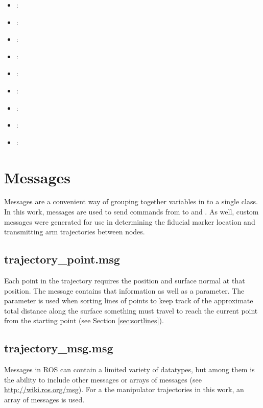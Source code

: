 \begin{itemize}

\item {} : 
\item {} : 
\item {} : 
\item {} : 
\item {} : 
\item {} : 
\item {} : 
\item {} : 
\item {} : 
\end{itemize}

\section{Messages}

Messages are a convenient way of grouping together variables in to a single class. In this work, messages are used to send commands from  to  and . As well, custom messages were generated for use in determining the fiducial marker location and transmitting arm trajectories between nodes.\\

\subsection{trajectory\_point.msg}
Each point in the trajectory requires the position and surface normal at that position. The  message contains that information as well as a  parameter. The  parameter is used when sorting lines of points to keep track of the approximate total distance along the surface something must travel to reach the current point from the starting point (see Section \ref{sec:sortlines}).\\
\subsection{trajectory\_msg.msg}
\label{sec:trajmsg}
Messages in ROS can contain a limited variety of datatypes, but among them is the ability to include other messages or arrays of messages (see \url{http://wiki.ros.org/msg}). For a the manipulator trajectories in this work, an array of  messages is used.\\

